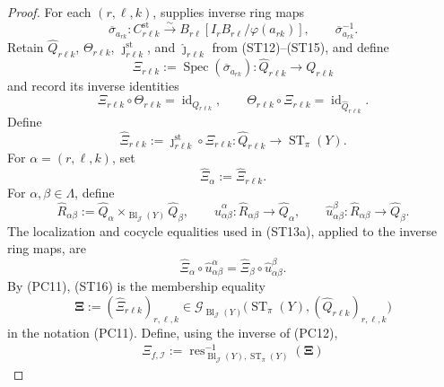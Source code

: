 \begin{proof}
  For each $(r,\ell,k)$,
   supplies inverse ring maps
  \[
    \overline\sigma_{a_{rk}}\colon
      C^{\mathrm{st}}_{r\ell k}
        \xrightarrow{\sim}
      B_{r\ell}[I_rB_{r\ell}/\varphi(a_{rk})],
    \qquad
    \overline\sigma_{a_{rk}}^{-1}.
  \]
  Retain $\widehat Q_{r\ell k}$, $\Theta_{r\ell k}$,
  $\jmath_{r\ell k}^{\mathrm{st}}$, and
  $\widehat\jmath_{r\ell k}$ from (ST12)--(ST15), and define
  \[
    \Xi_{r\ell k}
      :=\operatorname{Spec}(\overline\sigma_{a_{rk}})
      \colon\widehat Q_{r\ell k}\longrightarrow Q_{r\ell k}
  \]
  and record its inverse identities
  \[
    \Xi_{r\ell k}\circ\Theta_{r\ell k}
      =\operatorname{id}_{Q_{r\ell k}},
    \qquad
    \Theta_{r\ell k}\circ\Xi_{r\ell k}
      =\operatorname{id}_{\widehat Q_{r\ell k}}.
  \]
  Define
  \[
    \widehat\Xi_{r\ell k}:=
      \jmath_{r\ell k}^{\mathrm{st}}\circ\Xi_{r\ell k}
      \colon\widehat Q_{r\ell k}\to\operatorname{ST}_\pi(Y).
  \]
  For $\alpha=(r,\ell,k)$, set
  \[
    \widehat\Xi_\alpha:=\widehat\Xi_{r\ell k}.
  \]
  For $\alpha,\beta\in\Lambda$, define
  \[
    \widehat R_{\alpha\beta}:=
      \widehat Q_\alpha\times_{\operatorname{Bl}_{\mathcal J}(Y)}
        \widehat Q_\beta,
    \qquad
    \widehat u_{\alpha\beta}^\alpha\colon
      \widehat R_{\alpha\beta}\to\widehat Q_\alpha,
    \qquad
    \widehat u_{\alpha\beta}^\beta\colon
      \widehat R_{\alpha\beta}\to\widehat Q_\beta.
  \]
  The localization and cocycle equalities used in (ST13a), applied to the
  inverse ring maps, are
  \[
    \widehat\Xi_\alpha\circ\widehat u_{\alpha\beta}^\alpha
      =\widehat\Xi_\beta\circ\widehat u_{\alpha\beta}^\beta.
                                                                    \tag{ST16}
  \]
  By (PC11), (ST16) is the membership equality
  \[
    \mathbf\Xi:=(\widehat\Xi_{r\ell k})_{r,\ell,k}
      \in\mathscr G_{\operatorname{Bl}_{\mathcal J}(Y)}
        \bigl(\operatorname{ST}_\pi(Y),
          (\widehat Q_{r\ell k})_{r,\ell,k}\bigr)
  \]
  in the notation (PC11).  Define, using the inverse of (PC12),
  \[
  \begin{gathered}
    \Xi_{f,\mathcal I}:=
      \operatorname{res}_{\operatorname{Bl}_{\mathcal J}(Y),
        \operatorname{ST}_\pi(Y)}^{-1}(\mathbf\Xi)

\end{gathered}\]
\end{proof}
